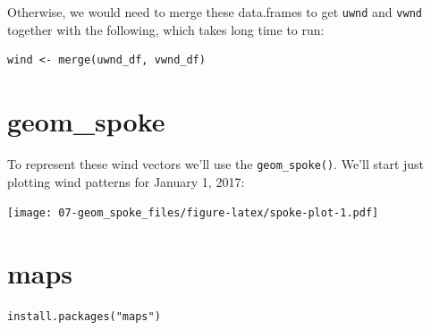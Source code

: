\documentclass[]{book}
\newenvironment{Shaded}{\begin{snugshade}}{\end{snugshade}}
\newcommand{\KeywordTok}[1]{\textcolor[rgb]{0.13,0.29,0.53}{\textbf{{#1}}}}
\newcommand{\DataTypeTok}[1]{\textcolor[rgb]{0.13,0.29,0.53}{{#1}}}
\newcommand{\DecValTok}[1]{\textcolor[rgb]{0.00,0.00,0.81}{{#1}}}
\newcommand{\StringTok}[1]{\textcolor[rgb]{0.31,0.60,0.02}{{#1}}}
\newcommand{\NormalTok}[1]{{#1}}
\theoremstyle{definition}
\theoremstyle{definition}
\theoremstyle{remark}
\begin{document}
Otherwise, we would need to merge these data.frames to get \texttt{uwnd}
and \texttt{vwnd} together with the following, which takes long time to
run:

\begin{verbatim}
wind <- merge(uwnd_df, vwnd_df)
\end{verbatim}

\hypertarget{geom_spoke}{\section{geom\_spoke}\label{geom_spoke}}

To represent these wind vectors we'll use the \texttt{geom\_spoke()}.
We'll start just plotting wind patterns for January 1, 2017:

\begin{Shaded}
\end{Shaded}

\texttt{[image: 07-geom\_spoke\_files/figure-latex/spoke-plot-1.pdf]}

\section{maps}\label{maps}

\begin{verbatim}
install.packages("maps")
\end{verbatim}
\end{document}
